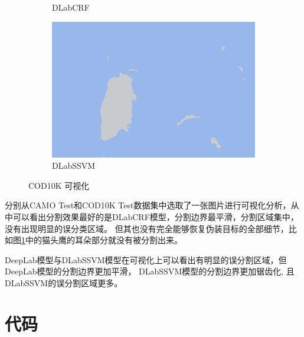 \documentclass[a4paper,12pt]{ctexart}
\begin{document}
\begin{figure}[h!]
\begin{subfigure}{0.25\textwidth}
        \caption{DLabCRF}
    \end{subfigure}%
    \hfill
    \begin{subfigure}{0.25\textwidth}
        \centering
        \includegraphics[width=\linewidth]{figures/COD10K_demo1/COD10K_demo1_pred_dlap.png}
        \caption{DLabSSVM}
    \end{subfigure}
    
    \caption{COD10K 可视化 \label{fig:COD10K_demo1}}
\end{figure}

分别从CAMO Test和COD10K Test数据集中选取了一张图片进行可视化分析，从中可以看出分割效果最好的是DLabCRF模型，分割边界最平滑，分割区域集中，没有出现明显的误分类区域。
但其也没有完全能够恢复伪装目标的全部细节，比如图\ref{fig:COD10K_demo1}中的猫头鹰的耳朵部分就没有被分割出来。

DeepLab模型与DLabSSVM模型在可视化上可以看出有明显的误分割区域，但DeepLab模型的分割边界更加平滑，
DLabSSVM模型的分割边界更加锯齿化, 且DLabSSVM的误分割区域更多。

\section{代码}




\end{document}
